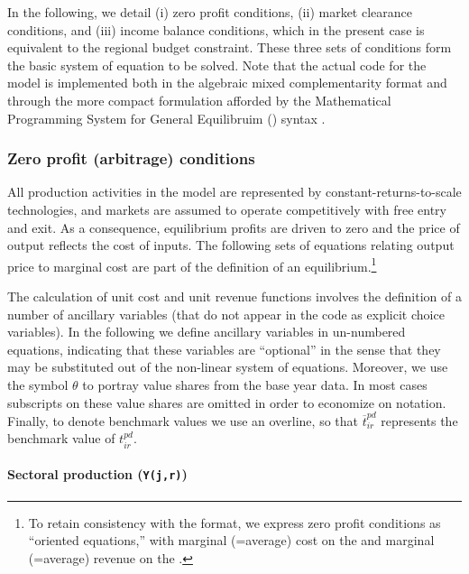 In the following, we detail (i) zero profit conditions, (ii) market clearance conditions, and (iii) income balance conditions, which in the present case is equivalent to the regional budget constraint.
These three sets of conditions form the basic system of equation to be solved.
Note that the actual code for the model is implemented both in the algebraic mixed complementarity format \citep[\GAMS/\MCP, see][]{Rutherford1995} and through the more compact formulation afforded by the Mathematical Programming System for General Equilibruim (\MPSGE) syntax \citep{Rutherford1999}.

\subsubsection[Zero profit]{Zero profit (arbitrage) conditions}

All production activities in the model are represented by constant-returns-to-scale technologies, and markets are assumed to operate competitively with free entry and exit.
As a consequence, equilibrium profits are driven to zero and the price of output reflects the cost of inputs.
The following sets of equations relating output price to marginal cost are part of the definition of an equilibrium.\footnote{To retain consistency with the \MCP format, we express zero profit conditions as ``oriented equations,'' with marginal (=average) cost on the \LHS and marginal (=average) revenue on the \RHS.}

The calculation of unit cost and unit revenue functions involves the definition of a number of ancillary variables (that do not appear in the \GAMS code as explicit choice variables).
In the following we define ancillary variables in un-numbered equations, indicating that these variables are ``optional'' in the sense that they may be substituted out of the non-linear system of equations.
Moreover, we use the symbol $\theta$ to portray value shares from the base year data.
In most cases subscripts on these value shares are omitted in order to economize on notation.
Finally, to denote benchmark values we use an overline, so that $\overline{t}^{pd}_{ir}$ represents the benchmark value of ${t}^{pd}_{ir}$.

\paragraph{\bf Sectoral production (\texttt{Y(j,r)})}

